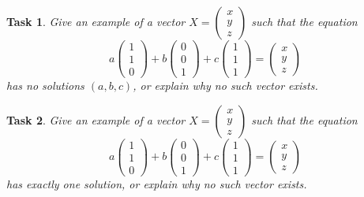 \documentclass[10pt,]{book}
\theoremstyle{plain}
\numberwithin{equation}{section}
\newtheorem{task}{Task}[chapter]
\begin{document}
\begin{task}
\label{task-10}
Give an example of a vector \(X =
                  \begin{pmatrix} x \\ y \\ z\end{pmatrix}\) such that the
                  equation \[ a \begin{pmatrix} 1 \\ 1 \\ 0 \end{pmatrix} + b
                  \begin{pmatrix} 0 \\ 0 \\ 1\end{pmatrix} + c \begin{pmatrix} 1
                  \\ 1 \\ 1\end{pmatrix} = \begin{pmatrix}x \\ y \\ z \end{pmatrix}
                \] has no solutions \((a,b,c)\), or explain why no such vector
                  exists.%
\end{task}
\begin{task}
\label{task-11}
Give an example of a vector \(X = \begin{pmatrix} x \\ y \\ z\end{pmatrix}\) such that the equation \[ a \begin{pmatrix} 1 \\ 1 \\ 0 \end{pmatrix} + b \begin{pmatrix} 0 \\ 0 \\ 1\end{pmatrix} + c \begin{pmatrix} 1 \\ 1 \\ 1\end{pmatrix} = \begin{pmatrix}x \\ y \\ z \end{pmatrix}\] has exactly one solution, or explain why no such vector exists.%
\end{task}
\end{document}
